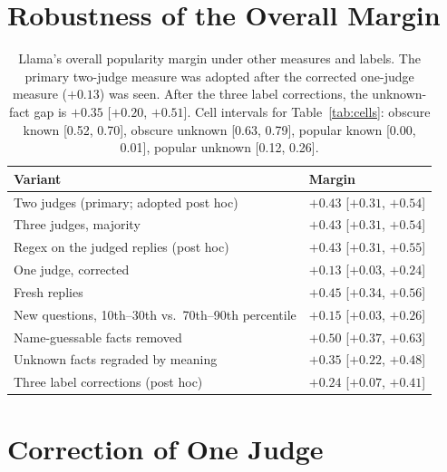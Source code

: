 \documentclass[letterpaper]{article} %
\begin{document}


\appendix

\section{Robustness of the Overall Margin}
\label{app:robust}

\begin{table}[!ht]
\centering
\small
\begin{tabular}{@{}p{}l@{}}
\toprule
Variant & Margin \\
\midrule
Two judges (primary; adopted post hoc) & $+0.43$ [$+0.31$, $+0.54$] \\
Three judges, majority & $+0.43$ [$+0.31$, $+0.54$] \\
Regex on the judged replies (post hoc) & $+0.43$ [$+0.31$, $+0.55$] \\
One judge, corrected & $+0.13$ [$+0.03$, $+0.24$] \\
Fresh replies & $+0.45$ [$+0.34$, $+0.56$] \\
New questions, 10th--30th vs.\ 70th--90th percentile & $+0.15$ [$+0.03$, $+0.26$] \\
Name-guessable facts removed & $+0.50$ [$+0.37$, $+0.63$] \\
Unknown facts regraded by meaning & $+0.35$ [$+0.22$, $+0.48$] \\
Three label corrections (post hoc) & $+0.24$ [$+0.07$, $+0.41$] \\
\bottomrule
\end{tabular}
\caption{Llama's overall popularity margin under other measures and labels. The primary two-judge measure was adopted after the corrected one-judge measure ($+0.13$) was seen. After the three label corrections, the unknown-fact gap is $+0.35$ [$+0.20$, $+0.51$]. Cell intervals for Table~\ref{tab:cells}: obscure known [0.52, 0.70], obscure unknown [0.63, 0.79], popular known [0.00, 0.01], popular unknown [0.12, 0.26].}
\label{tab:robust}
\end{table}

\section{Correction of One Judge}
\label{app:judge}
\end{document}
